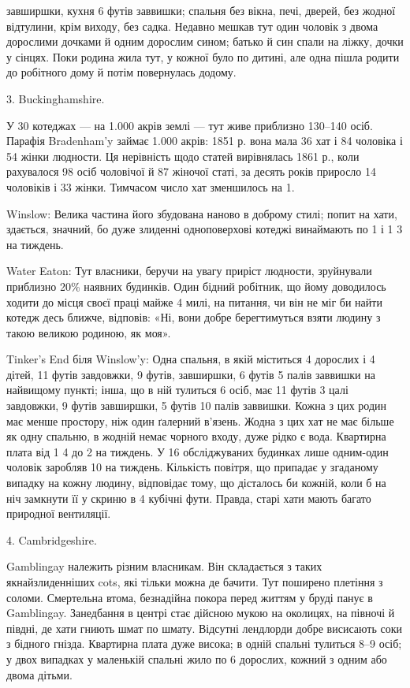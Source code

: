 \parcont{}  %
завширшки, кухня 6 футів заввишки; спальня без вікна, печі,
дверей, без жодної відтулини, крім виходу, без садка. Недавно
мешкав тут один чоловік з двома дорослими дочками й одним
дорослим сином; батько й син спали на ліжку, дочки у сінцях.
Поки родина жила тут, у кожної було по дитині, але одна пішла
родити до робітного дому й потім повернулась додому.

3. Buckinghamshire.

У 30 котеджах — на \num{1.000} акрів землі — тут живе приблизно
130--140 осіб. Парафія Bradenham’y займає \num{1.000} акрів: 1851 р.
вона мала 36 хат і 84 чоловіка і 54 жінки людности. Ця нерівність
щодо статей вирівнялась 1861 р., коли рахувалося 98 осіб
чоловічої й 87 жіночої статі, за десять років приросло 14 чоловіків
і 33 жінки. Тимчасом число хат зменшилось на 1.

Winslow: Велика частина його збудована наново в доброму
стилі; попит на хати, здається, значний, бо дуже злиденні одноповерхові
котеджі винаймають по 1 і 1 3
на тиждень.

Water Eaton: Тут власники, беручи на увагу приріст людности,
зруйнували приблизно 20\% наявних будинків. Один бідний
робітник, що йому доводилось ходити до місця своєї праці
майже 4 милі, на питання, чи він не міг би найти котедж десь
ближче, відповів: «Ні, вони добре берегтимуться взяти людину
з  такою великою родиною, як моя».

Tinker’s End біля Winslow’y: Одна спальня, в якій міститься
4 дорослих і 4 дітей, 11 футів завдовжки, 9 футів, завширшки,
6 футів 5 палів заввишки на найвищому пункті; інша, що в ній
тулиться 6 осіб, має 11 футів 3 цалі завдовжки, 9 футів завширшки,
5 футів 10 палів заввишки. Кожна з цих родин має менше
простору, ніж один ґалерний в’язень. Жодна з цих хат не має
більше як одну спальню, в жодній немає чорного входу, дуже
рідко є вода. Квартирна плата від 1 4 до 2
на тиждень. У 16 обсліджуваних будинках лише одним-один
чоловік заробляв 10 на тиждень. Кількість повітря, що
припадає у згаданому випадку на кожну людину, відповідає
тому, що дісталось би кожній, коли б на ніч замкнути її у скриню
в 4 кубічні фути. Правда, старі хати мають багато природної
вентиляції.

4. Cambridgeshire.

Gamblingay належить різним власникам. Він складається з
таких якнайзлиденніших cots, які тільки можна де бачити.
Тут поширено плетіння з соломи. Смертельна втома, безнадійна
покора перед життям у бруді панує в Gamblingay. Занедбання
в центрі стає дійсною мукою на околицях, на півночі й півдні, де
хати гниють шмат по шмату. Відсутні лендлорди добре висисають
соки з бідного гнізда. Квартирна плата дуже висока;
в одній спальні тулиться 8--9 осіб; у двох випадках у маленькій
спальні жило по 6 дорослих, кожний з одним або двома дітьми.
\parbreak{}  %
